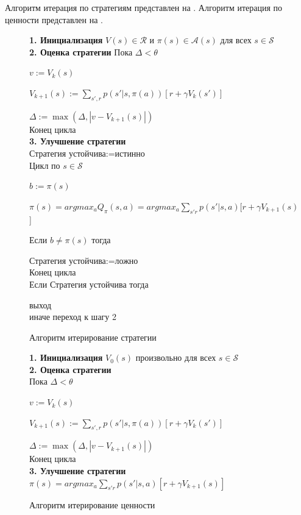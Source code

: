 Алгоритм итерация по стратегиям представлен на . Алгоритм итерация по ценности представлен на  .
\begin{figure}[ht!]
	\begin{tcolorbox}
		\textbf{1. Инициализация} $V(s) \in \mathcal{R}$ и $\pi(s) \in \mathcal{A}(s)$ для всех $s \in \mathcal{S}$ \\
		\textbf{2. Оценка стратегии}
		Пока {$\Delta < \theta$}
		
		{$v:=V_k(s)$}
		
		{$V_{k+1}(s):=\sum_{s',r}p(s'|s,\pi(a))[r + \gamma V_k(s')]$}
		
		$\Delta := \max(\Delta, |v - V_{k+1}(s)|)$\\
		Конец цикла\\
		{\textbf{3. Улучшение стратегии}}\\
		{Стратегия устойчива:=истинно}\\
		Цикл {по $s\in\mathcal{S}$}
		
		{$b:=\pi(s)$}
		
		{$\pi(s) = argmax_a Q_{\pi}(s, a) = argmax_a \sum_{s'r}p(s'|s,a)[r + \gamma V_{k+1}(s)$]}
		
		Если {$b\neq \pi(s)$} тогда
		
		Стратегия устойчива:=ложно\\
		Конец цикла\\
		Если Стратегия устойчива тогда
		
		выход\\
		иначе переход к шагу 2
		
	\end{tcolorbox}
	\caption{Алгоритм итерирование стратегии}
	\label{fig:PI-ch1}
\end{figure}



\begin{figure}[ht!]
\begin{tcolorbox}
 \textbf{1. Инициализация} $V_0(s)$  произвольно для всех $s \in \mathcal{S}$\\ 
{\textbf{2. Оценка стратегии}}\\
Пока {$\Delta < \theta$}

{$v:=V_k(s)$}

{$V_{k+1}(s):=\sum_{s',r}p(s'|s,\pi(a))[r + \gamma V_k(s')]$}

$\Delta := \max(\Delta, |v - V_{k+1}(s)|)$\\
Конец цикла\\
{\textbf{3. Улучшение стратегии}}\\
{$\pi(s) = argmax_a \sum_{s'r}p(s'|s,a)[r + \gamma V_{k+1}(s)]$}\\

\end{tcolorbox}
	\caption{Алгоритм итерирование ценности}
	\label{alg:VI}
\end{figure}
%

